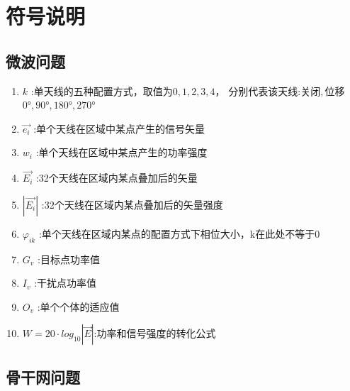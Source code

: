 \documentclass[UTF8,12pt]{ctexart}
\begin{document}
\section{符号说明}
    \subsection{微波问题}
        \begin{enumerate}
            \item $k$ :单天线的五种配置方式，取值为$0,1,2,3,4$，
            分别代表该天线:关闭$,$位移$0°,90°,180°,270°$
            \item $\overrightarrow{e_i}$ :单个天线在区域中某点产生的信号矢量
            \item $w_i$ :单个天线在区域中某点产生的功率强度
            \item $\overrightarrow{E_i}$ :32个天线在区域内某点叠加后的矢量
            \item $|\overrightarrow{E_i}|$ :32个天线在区域内某点叠加后的矢量强度
            \item $\varphi_{ik}$ :单个天线在区域内某点的配置方式下相位大小，k在此处不等于0
            \item $G_v$ :目标点功率值
            \item $I_v$ :干扰点功率值
            \item $O_v$ :单个个体的适应值
            \item $W = 20\cdot log_{10}{|\overrightarrow{E}|}$:功率和信号强度的转化公式
        
       
        \end{enumerate}
    
    \subsection{骨干网问题}
\end{document}
